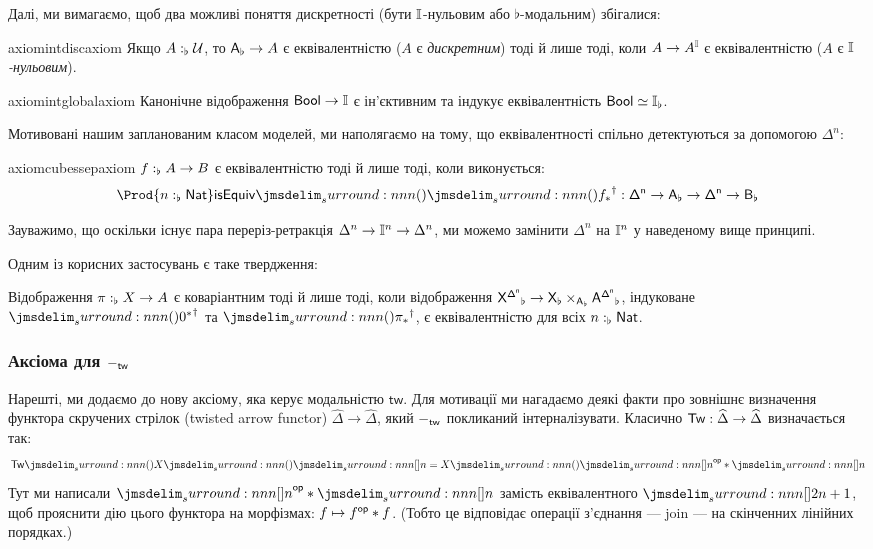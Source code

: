 \documentclass[12pt]{article}
\newcommand{\SIMP}{\Delta}
\newcommand{\PSH}[1]{\widehat{#1}}
\newcommand{\Equiv}{\mathrel{\simeq}}
\newcommand{\GM}{\flat}
\newcommand{\TM}{\mathsf{tw}}
\let\prn\DelimPrn
\let\brk\DelimBrk
\begin{document}
Далі, ми вимагаємо, щоб два можливі поняття дискретності (бути $\mathbb{I}$-нульовим або $\GM$-модальним) збігалися:

\begin{restatable}{axiom}{intdiscaxiom}
  \label{ax:discrete-iff-crisp}
  Якщо $\DeclVar{A}{\GM}{\Uni}$, то $\Modify[\GM]{A} \to A$ є еквівалентністю \textup($A$ є \emph{дискретним}\textup) тоді й лише тоді, коли $A \to A^{\mathbb{I}}$ є еквівалентністю \textup($A$ є \emph{$\mathbb{I}$-нульовим}\textup).
\end{restatable}
\begin{restatable}{axiom}{intglobalaxiom}
  \label{ax:global-points}
  Канонічне відображення ${\mathsf{Bool}} \to \mathbb{I}$ є ін'єктивним та індукує еквівалентність $\Bool \Equiv \Modify[\GM]{\Int}$.
\end{restatable}
Мотивовані нашим запланованим класом моделей, ми наполягаємо на тому, що еквівалентності спільно детектуються за допомогою $\Delta^n$:

\begin{restatable}{axiom}{cubessepaxiom}
  \label{ax:cubes-separate}
  $\DeclVar{f}{\GM}{A \to B}$ є еквівалентністю тоді й лише тоді, коли виконується:
    \[
      \Prod{\DeclVar{n}{\GM}{\Nat}}
      \IsEquiv\prn{
        \prn{f_*}^\dagger : \Modify[\GM]{\Delta^n \to A}
        \to
        \Modify[\GM]{\Delta^n \to B}
      }
    \]
\end{restatable}
\noindent
Зауважимо, що оскільки існує пара переріз-ретракція $\Delta^n \to \mathbb{I}^n \to \Delta^n$, ми можемо замінити $\Delta^n$ на $\mathbb{I}^n$ у наведеному вище принципі.

Одним із корисних застосувань є таке твердження:
\begin{lem}
  \label{lem:prelims:covariance-simplices}
  Відображення $\DeclVar{\pi}{\GM}{X \to A}$ є коваріантним тоді й лише тоді, коли відображення
  $\Modify[\GM]{X^{\Delta^n}} \to \Modify[\GM]X \times_{\Modify[\GM]A} \Modify[\GM]{A^{\Delta^n}}$,
  індуковане $\prn{0^*}^\dagger$ та $\prn{\pi_*}^\dagger$, є еквівалентністю для всіх $\DeclVar n\GM\Nat$.
\end{lem}


\subsubsection*{Аксіома для $\Modify[\TM]{-}$}
Нарешті, ми додаємо до \STT{} нову аксіому, яка керує модальністю $\TM$. Для мотивації ми нагадаємо деякі факти про зовнішнє визначення функтора скручених стрілок (twisted arrow functor) $\PSH{\SIMP} \to \PSH{\SIMP}$, який $\Modify[\TM]{-}$ покликаний інтерналізувати. Класично $\Con{Tw} : \PSH{\SIMP} \to \PSH{\SIMP}$ визначається так:
\[
  \Con{Tw}\prn{X}\prn{\brk{n}} = X\prn{\Op{\brk{n}} \ast \brk{n}}
\]
Тут ми написали $\Op{\brk{n}} \ast \brk{n}$ замість еквівалентного $\brk{2n + 1}$, щоб прояснити дію цього функтора на морфізмах: $f \mapsto {f}^{\mathsf{op}} \ast f$. (Тобто це відповідає операції з'єднання --- join --- на скінченних лінійних порядках.)
\end{document}
